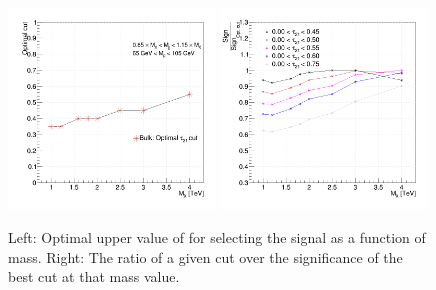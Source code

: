\begin{figure}[h!]
\begin{center}
\includegraphics[width=0.49\textwidth]{figures/analysis/search1/AN-15-196/tau21optimisation/HP_Punzi_BulkWW.png}
\includegraphics[width=0.49\textwidth]{figures/analysis/search1/AN-15-196/tau21optimisation/HP_CutSignificance_bulkWW.png}\\
\caption{Left: Optimal upper value of \nsubj for selecting the signal as a function of \BulkG mass. Right: The ratio of a given \nsubj cut over the significance of the best cut at that mass value.}
\label{fig:searchI:tau21_punzi}
\end{center}
\end{figure}
